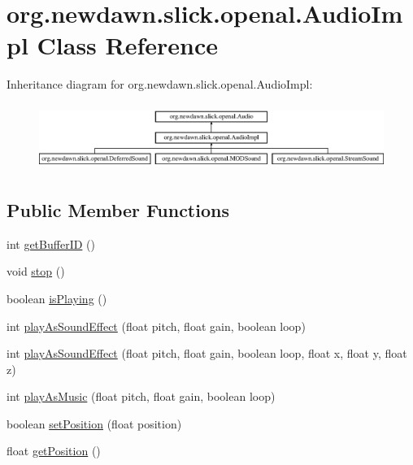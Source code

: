 \hypertarget{classorg_1_1newdawn_1_1slick_1_1openal_1_1_audio_impl}{}\section{org.\+newdawn.\+slick.\+openal.\+Audio\+Impl Class Reference}
\label{classorg_1_1newdawn_1_1slick_1_1openal_1_1_audio_impl}
Inheritance diagram for org.\+newdawn.\+slick.\+openal.\+Audio\+Impl\+:\begin{figure}[H]
\begin{center}
\leavevmode
\includegraphics[height=2.170543cm]{classorg_1_1newdawn_1_1slick_1_1openal_1_1_audio_impl}
\end{center}
\end{figure}
\subsection*{Public Member Functions}
\begin{DoxyCompactItemize}
\item 
int \mbox{\hyperlink{classorg_1_1newdawn_1_1slick_1_1openal_1_1_audio_impl_aaf5df57bc6269d59c5220fc89ef3800f}{get\+Buffer\+ID}} ()
\item 
void \mbox{\hyperlink{classorg_1_1newdawn_1_1slick_1_1openal_1_1_audio_impl_a8ad896e19c35a9d3d1d93e52685158ff}{stop}} ()
\item 
boolean \mbox{\hyperlink{classorg_1_1newdawn_1_1slick_1_1openal_1_1_audio_impl_a842212ec52d43824dee1d7c6e7fa4ce1}{is\+Playing}} ()
\item 
int \mbox{\hyperlink{classorg_1_1newdawn_1_1slick_1_1openal_1_1_audio_impl_a731e0f7331c13b1c6507303ab875c6da}{play\+As\+Sound\+Effect}} (float pitch, float gain, boolean loop)
\item 
int \mbox{\hyperlink{classorg_1_1newdawn_1_1slick_1_1openal_1_1_audio_impl_a400627f68fca6dfd837fcce2d8536527}{play\+As\+Sound\+Effect}} (float pitch, float gain, boolean loop, float x, float y, float z)
\item 
int \mbox{\hyperlink{classorg_1_1newdawn_1_1slick_1_1openal_1_1_audio_impl_ac8b7973bc209b0a2ecfc169b1d9eaae4}{play\+As\+Music}} (float pitch, float gain, boolean loop)
\item 
boolean \mbox{\hyperlink{classorg_1_1newdawn_1_1slick_1_1openal_1_1_audio_impl_a9291d2e2d534fdfbd6a50e4948de954f}{set\+Position}} (float position)
\item 
float \mbox{\hyperlink{classorg_1_1newdawn_1_1slick_1_1openal_1_1_audio_impl_a71aa3ed24fc3e7e4e8603b89250b35bd}{get\+Position}} ()
\end{DoxyCompactItemize}

